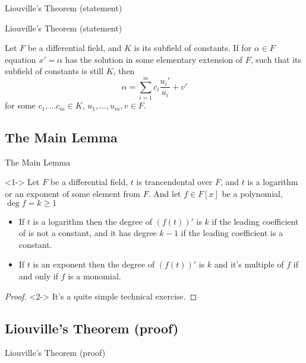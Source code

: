 \documentclass[8pt]{beamer}
\renewcommand{\|}{\ensuremath{\hspace{0.1cm} | \hspace{0.1cm}}}
\renewcommand{\ge}{\geqslant}
\begin{document}
    \begin{section}{Liouville's Theorem (statement)}
    \begin{frame}{Liouville's Theorem (statement)}
        \begin{theorem}[Liouville, 1833-1841]
            Let $F$ be a differential field, and $K$ is its subfield of constants. 
            If for $\alpha\in F$ equation $x' = \alpha$ has the solution in some elementary extension of $F$, such that its subfield of constants is still $K$, then
            \[
                \alpha = \sum\limits_{i=1}^m c_i \frac{u_i'}{u_i} + v'
            \]
            for some $c_1, \ldots c_m \in K$, $u_1, \ldots, u_m, v \in F$.
        \end{theorem}
    \end{frame}

    \section{The Main Lemma}
    \begin{frame}{The Main Lemma}
        \begin{lemma}<1->
            Let $F$ be a differential field, $t$ is trancendental over $F$, and $t$ is a logarithm or an exponent of some element from $F$. 
            And let $f\in F[x]$ be a polynomial, $\deg{f} = k \ge 1$
            \begin{itemize}
                \item If $t$ is a logarithm then the degree of $(f(t))'$ is $k$ if the leading coefficient of is not a constant, and it has degree $k-1$ if  the leading coefficient is a constant.
                \item If $t$ is an exponent then the degree of $(f(t))'$ is $k$ and it's multiple of $f$ if and only if $f$ is a monomial.
            \end{itemize}
        \end{lemma}

        \begin{proof}<2->
            It's a quite simple technical exercise.
        \end{proof}
    \end{frame}

    \section{Liouville's Theorem (proof)}
    \begin{frame}{Liouville's Theorem (proof)}
\end{frame}
\end{section}
\end{document}
